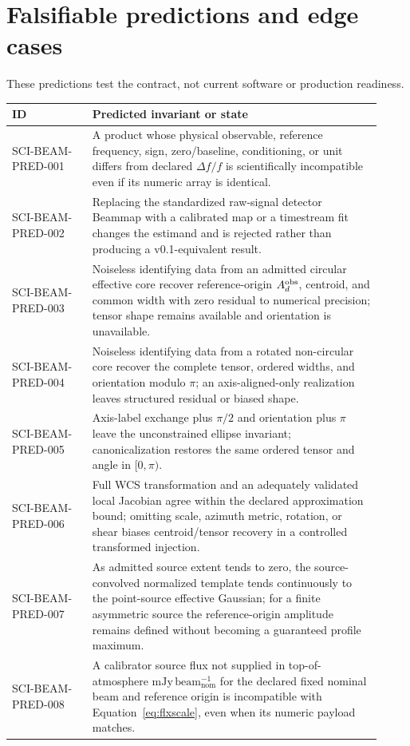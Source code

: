 \section{Falsifiable predictions and edge cases}
\label{sec:predictions}
These predictions test the contract, not current software or production readiness.
\begin{longtable}{>{\raggedright\arraybackslash\ttfamily\scriptsize}p{0.20\linewidth}L{0.72\linewidth}}
\toprule ID & Predicted invariant or state \\
\midrule
SCI-BEAM-PRED-001 & A product whose physical observable, reference frequency, sign, zero/baseline, conditioning, or unit differs from declared $\Delta f/f$ is scientifically incompatible even if its numeric array is identical. \\
SCI-BEAM-PRED-002 & Replacing the standardized raw-signal detector Beammap with a calibrated map or a timestream fit changes the estimand and is rejected rather than producing a v0.1-equivalent result. \\
SCI-BEAM-PRED-003 & Noiseless identifying data from an admitted circular effective core recover reference-origin $A_d^{\rm obs}$, centroid, and common width with zero residual to numerical precision; tensor shape remains available and orientation is unavailable. \\
SCI-BEAM-PRED-004 & Noiseless identifying data from a rotated non-circular core recover the complete tensor, ordered widths, and orientation modulo $\pi$; an axis-aligned-only realization leaves structured residual or biased shape. \\
SCI-BEAM-PRED-005 & Axis-label exchange plus $\pi/2$ and orientation plus $\pi$ leave the unconstrained ellipse invariant; canonicalization restores the same ordered tensor and angle in $[0,\pi)$. \\
SCI-BEAM-PRED-006 & Full WCS transformation and an adequately validated local Jacobian agree within the declared approximation bound; omitting scale, azimuth metric, rotation, or shear biases centroid/tensor recovery in a controlled transformed injection. \\
SCI-BEAM-PRED-007 & As admitted source extent tends to zero, the source-convolved normalized template tends continuously to the point-source effective Gaussian; for a finite asymmetric source the reference-origin amplitude remains defined without becoming a guaranteed profile maximum. \\
SCI-BEAM-PRED-008 & A calibrator source flux not supplied in top-of-atmosphere $\mathrm{mJy\,beam_{nom}^{-1}}$ for the declared fixed nominal beam and reference origin is incompatible with Equation~\ref{eq:flxscale}, even when its numeric payload matches. \\

\end{longtable}
